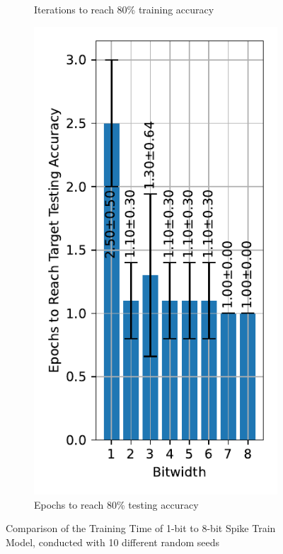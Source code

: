 \begin{figure}[!htpb]
\begin{subfigure}[H]{0.45\textwidth}
            \caption{Iterations to reach 80\% training accuracy}
        \end{subfigure}
        \hfill
        \begin{subfigure}[H]{0.45\textwidth}
            \centering
            \includegraphics[width=\textwidth]{../standard/FashionMNIST/plots/fashionmnist_test_iters.pdf}
            \caption{Epochs to reach 80\% testing accuracy}
        \end{subfigure}
        \caption{Comparison of the Training Time of 1-bit to 8-bit Spike Train Model, conducted with 10 different random seeds}
        \label{fig:iterations_fixed_accuracy}
    \end{figure}

